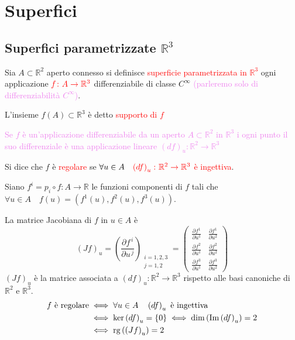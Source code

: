 \chapter{Superfici}
    \section{Superfici parametrizzate \texorpdfstring{$\mathbb{R}^3$}{R\textasciicircum 3}}
        \begin{definizione}
        Sia $A \subset \mathbb{R}^2$ aperto connesso si definisce \textcolor{red}{superficie parametrizzata in $\mathbb{R}^3$} 
        ogni applicazione $\textcolor{red}{f \colon A \to \mathbb{R}^3}$ differenziabile di classe $C^\infty$ 
        \textcolor{violet}{(parleremo solo di differenziabilità $C^\infty$)}.

        L'insieme $f(A) \subset \mathbb{R}^3$ è detto \textcolor{red}{supporto di $f$}

        \textcolor{violet}{Se $f$ è un'applicazione differenziabile da un aperto $A \subset \mathbb{R}^2$ in $\mathbb{R}^3$ i ogni 
        punto il suo differenziale è una applicazione lineare $ \left(df\right)_u \colon \mathbb{R}^2 \to \mathbb{R}^3$ }

        Si dice che $f$ è \textcolor{red}{regolare} se $\forall u \in A \quad \textcolor{red}{\left(df\right)_u \colon \mathbb{R}^2 \to \mathbb{R}^3}$ \textcolor{red}{è ingettiva}.

        Siano $f^i = p_i \circ f \colon A \to \mathbb{R}$ le funzioni componenti di $f$ tali che $\forall u \in A \quad f(u) = \left(f^1(u), f^2(u), f^3(u)\right)$.

        La matrice Jacobiana di $f$ in $u \in A$ è
        \[ \left(Jf\right)_u = \left( \dfrac{\partial f^{\, i}}{\partial u^{\, j}} \right)_{\substack{i=1,2,3 \\ j=1,2}}= \begin{pmatrix}
        \frac{\partial f^1}{\partial u^1} & \frac{\partial f^1}{\partial u^2} \\[2mm]
        \frac{\partial f^2}{\partial u^1} & \frac{\partial f^2}{\partial u^2} \\[2mm]
        \frac{\partial f^3}{\partial u^1} & \frac{\partial f^3}{\partial u^2}
        \end{pmatrix} \]
        $\left(Jf\right)_u $ è la matrice associata a $\left(df\right)_u \colon \mathbb{R}^2 \to \mathbb{R}^3$ rispetto alle basi canoniche di 
        $\mathbb{R}^2$ e $\mathbb{R}^3$.
        \begin{align*}
        f \text{ è regolare} &\iff \forall u \in A \quad \left(df\right)_u \text{ è ingettiva} \\
        &\iff \ker \left(df\right)_u = \{0\} \iff \dim \left(\operatorname{Im} \left(df\right)_u \right) = 2 \\
        &\iff \operatorname{rg} \left( \left(Jf\right)_u  \right) = 2
        \end{align*}
        \end{definizione}
